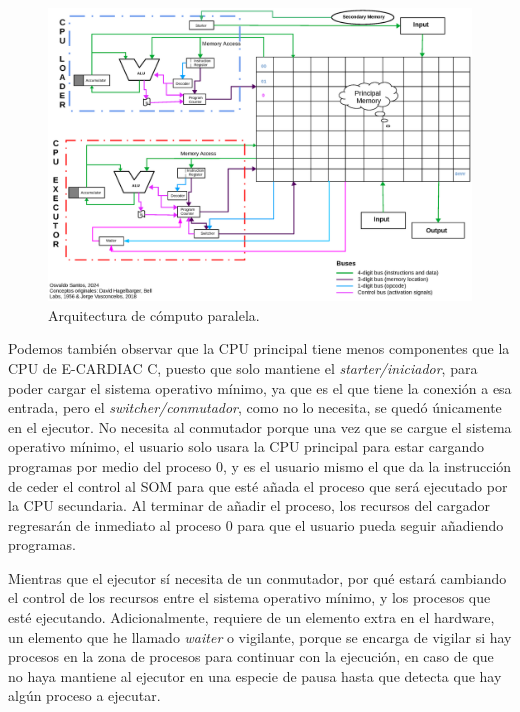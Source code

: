 \documentclass[letterpaper,12pt,oneside]{book}
\begin{document}
        \begin{figure}[H]		
			\centering
			\includegraphics[scale=0.63, angle=90]{media/Paralela/Arquitectura_diagrama_Paralelo.eps}
			\caption{ Arquitectura de cómputo paralela.}
			\label{fig:diag_arq_parallel}
		\end{figure}
  
		Podemos también observar que la CPU principal tiene menos componentes que la CPU de E-CARDIAC C, puesto que solo mantiene el \textit{starter/iniciador}, para
		poder cargar el sistema operativo mínimo, ya que es el que tiene la conexión a esa entrada, pero el \textit{switcher/conmutador}, como no lo necesita, se quedó
		únicamente en el ejecutor. No necesita al conmutador porque una vez que se cargue el sistema operativo mínimo, el usuario solo usara
		la CPU principal para estar cargando programas por medio del proceso 0, y es el usuario mismo el que da la instrucción de ceder el control
		al SOM para que esté añada el proceso que será ejecutado por la CPU secundaria. Al terminar de añadir el proceso, los recursos del cargador regresarán de inmediato al proceso 0 para que el usuario
		pueda seguir añadiendo programas.
		
		Mientras que el ejecutor sí necesita de un conmutador, por qué estará cambiando el control de los recursos entre el sistema operativo mínimo,
		y los procesos que esté ejecutando. Adicionalmente, requiere de un elemento extra en el hardware, un elemento que he llamado \textit{waiter} o vigilante, porque se encarga
		de vigilar si hay procesos en la zona de procesos para continuar con la ejecución, en caso de que no haya mantiene al ejecutor en una especie de
		pausa hasta que detecta que hay algún proceso a ejecutar.
  
\end{document}
